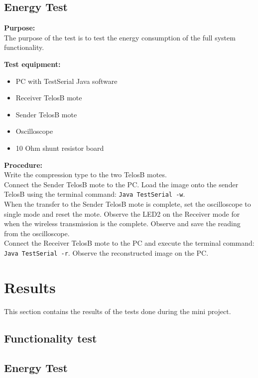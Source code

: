 \subsection{Energy Test}
\textbf{Purpose:}\\
The purpose of the test is to test the energy consumption of the full system functionality.

\textbf{Test equipment:}
\begin{itemize}
\item PC with TestSerial Java software
\item Receiver TelosB mote
\item Sender TelosB mote
\item Oscilloscope
\item 10 Ohm shunt resistor board
\end{itemize}

\textbf{Procedure:}\\
Write the compression type to the two TelosB motes.\\
Connect the Sender TelosB mote to the PC. Load the image onto the sender TelosB using the terminal command: \texttt{Java TestSerial -w}.\\
When the transfer to the Sender TelosB mote is complete, set the oscilloscope to single mode and reset the mote. Observe the LED2 on the Receiver mode for when the wireless transmission is the complete. Observe and save the reading from the oscilloscope.\\
Connect the Receiver TelosB mote to the PC and execute the terminal command: \texttt{Java TestSerial -r}. Observe the reconstructed image on the PC.


\section{Results}
This section contains the results of the tests done during the mini project.
\subsection{Functionality test}

\subsection{Energy Test}